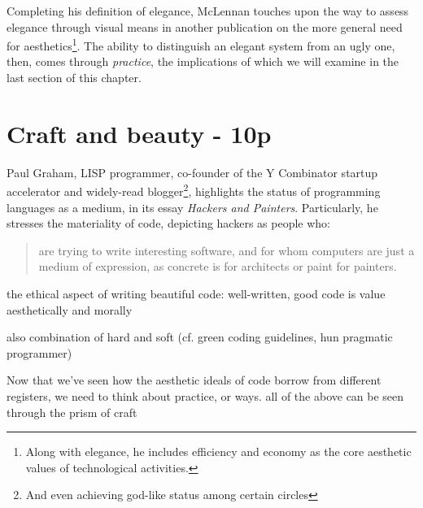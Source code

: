 Completing his definition of elegance, McLennan touches upon the way to assess elegance through visual means in another publication on the more general need for aesthetics\footnote{Along with elegance, he includes efficiency and economy as the core aesthetic values of technological activities.}. The ability to distinguish an elegant system from an ugly one, then, comes through \emph{practice}, the implications of which we will examine in the last section of this chapter\cite{schummer_aesthetic_2009}.


\pagebreak

\section{Craft and beauty - 10p}
\label{sec:craft}


Paul Graham, LISP programmer, co-founder of the Y Combinator startup accelerator and widely-read blogger\footnote{And even achieving god-like status among certain circles\cite{eadicicco_startup_2014}}, highlights the status of programming languages as a medium, in its essay \emph{Hackers and Painters}\cite{graham_hackers_2003}. Particularly, he stresses the materiality of code, depicting hackers as people who:

\begin{quote}
  are trying to write interesting software, and for whom computers are just a medium of expression, as concrete is for architects or paint for painters.
\end{quote}



the ethical aspect of writing beautiful code: well-written, good code is value aesthetically and morally

also combination of hard and soft (cf. green coding guidelines, hun pragmatic programmer)

Now that we've seen how the aesthetic ideals of code borrow from different registers, we need to think about practice, or ways. all of the above can be seen through the prism of craft

